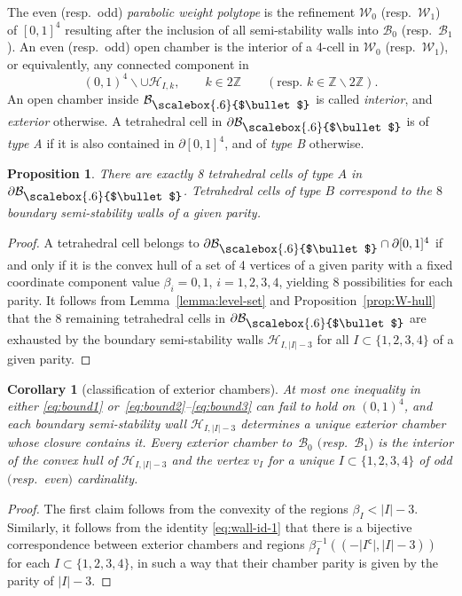 \documentclass[pdftex]{sigma}
\newcommand{\field}[1]{\ensuremath{\mathbb{#1}}}
\newcommand{\ZZ}{\field{Z}}
\newcommand\sbul[1][.6]{\mathbin{\vcenter{\hbox{\scalebox{#1}{$\bullet$}}}}}
\newcommand{\qB}{\mathcal{B}}
\newcommand{\qH}{\mathcal{H}}
\newcommand{\qW}{\mathcal{W}}
\numberwithin{equation}{section}
\newtheorem{Corollary}[Theorem]{Corollary}
\newtheorem{Proposition}[Theorem]{Proposition}
 { \theoremstyle{definition}
\newtheorem{Definition}[Theorem]{Definition}
\newtheorem{Note}[Theorem]{Note}
\newtheorem{Example}[Theorem]{Example}
\newtheorem{Remark}[Theorem]{Remark} }
\begin{document}
\begin{Definition}
The even (resp.~odd) \textit{parabolic weight polytope} is the refinement $\qW_{0}$ (resp.~$\qW_{1}$) of $[0,1]^{4}$ resulting after the inclusion of all semi-stability walls into $\qB_{0}$ (resp.~$\qB_{1}$). An even (resp.~odd) {open chamber} is the interior of a 4-cell in $\qW_{0}$ (resp.~$\qW_{1}$), or equivalently, any connected component in
\[
(0,1)^{4}\backslash\cup \qH_{I,k},\qquad k\in 2\ZZ\qquad (\text{resp.~} k\in\ZZ\backslash 2\ZZ).
\]
An open chamber inside $\qB_{\sbul}$ is called \emph{interior}, and \emph{exterior} otherwise. A tetrahedral cell in $\partial\qB_{\sbul}$ is of \textit{type A} if it is also contained in $\partial[0,1]^{4}$, and of \textit{type B} otherwise.
\end{Definition}

\begin{Proposition}%
There are exactly 8 tetrahedral cells of type $A$ in $\partial\qB_{\sbul}$.
Tetrahedral cells of type $B$ correspond to the $8$ boundary semi-stability walls of a given parity.
\end{Proposition}

\begin{proof}
A tetrahedral cell belongs to $\partial\qB_{\sbul}\cap\partial[0,1]^{4}$ if and only if it is the convex hull of a set of 4 vertices of a given parity with a fixed coordinate component value $\beta_{i}=0,1$, $i=1,2,3,4$, yielding 8 possibilities for each parity. It follows from Lemma~\ref{lemma:level-set} and Proposition~\ref{prop:W-hull} that the 8 remaining tetrahedral cells in $\partial\qB_{\sbul}$ are exhausted by the boundary semi-stability walls $\qH_{I,\vert I\vert -3}$ for all $I\subset\{1,2,3,4\}$ of a given parity.
\end{proof}

\begin{Corollary}[classification of exterior chambers]\label{cor:ex-chambers}
At most one inequality in either \eqref{eq:bound1} or~\eqref{eq:bound2}--\eqref{eq:bound3} can fail to hold on $(0,1)^{4}$, and each boundary semi-stability wall $\qH_{I,\vert I\vert - 3}$ determines a unique exterior chamber whose closure contains it. Every exterior chamber to~$\qB_{0}$ $($resp.~$\qB_{1})$ is the interior of the convex hull of $\qH_{I,\vert I\vert - 3}$ and the vertex $v_{I}$ for a unique $I\subset \{1,2,3,4\}$ of odd $($resp.~even$)$ cardinality.
\end{Corollary}

\begin{proof}
The first claim follows from the convexity of the regions $\beta_{I} < \vert I\vert - 3$. Similarly, it follows from the identity \eqref{eq:wall-id-1} that there is a bijective correspondence between exterior chambers and regions $\beta^{-1}_{I}((-\vert I^{\mathsf{c}}\vert ,\vert I\vert - 3))$ for each $I\subset\{1,2,3,4\}$, in such a way that their chamber parity is given by the parity of $\vert I\vert -3$.
\end{proof}
\end{document}
